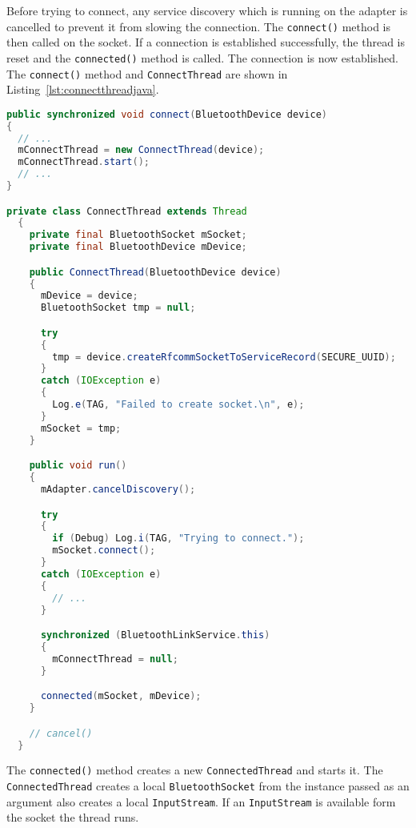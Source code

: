 \documentclass[11pt, a4paper, oneside, english]{scrbook}
\begin{document}
Before trying to connect, any service discovery which is running on the adapter is cancelled to prevent it from slowing the connection. The \texttt{connect()} method is then called on the socket. If a connection is established successfully, the thread is reset and the \texttt{connected()} method is called. The connection is now established. The \texttt{connect()} method and \texttt{ConnectThread} are shown in Listing~\ref{lst:connectthreadjava}.
\begin{lstlisting}[language=Java,
                   caption={The \texttt{connect()} method and \texttt{ConnectThread}.},
                   label=lst:connectthreadjava,
                   numbers=none]
public synchronized void connect(BluetoothDevice device)
{
  // ...
  mConnectThread = new ConnectThread(device);
  mConnectThread.start();
  // ...  
}

private class ConnectThread extends Thread
  {
    private final BluetoothSocket mSocket;
    private final BluetoothDevice mDevice;

    public ConnectThread(BluetoothDevice device)
    {
      mDevice = device;
      BluetoothSocket tmp = null;

      try
      {
        tmp = device.createRfcommSocketToServiceRecord(SECURE_UUID);
      }
      catch (IOException e)
      {
        Log.e(TAG, "Failed to create socket.\n", e);
      }
      mSocket = tmp;
    }

    public void run()
    {
      mAdapter.cancelDiscovery();

      try
      {
        if (Debug) Log.i(TAG, "Trying to connect.");
        mSocket.connect();
      }
      catch (IOException e)
      {
        // ...
      }

      synchronized (BluetoothLinkService.this)
      {
        mConnectThread = null;
      }

      connected(mSocket, mDevice);
    }

    // cancel()
  }
\end{lstlisting}
The \texttt{connected()} method creates a new \texttt{ConnectedThread} and starts it. The \texttt{ConnectedThread} creates a local \texttt{BluetoothSocket} from the instance passed as an argument also creates a local \texttt{InputStream}. If an \texttt{InputStream} is available form the socket the thread runs.
\end{document}
